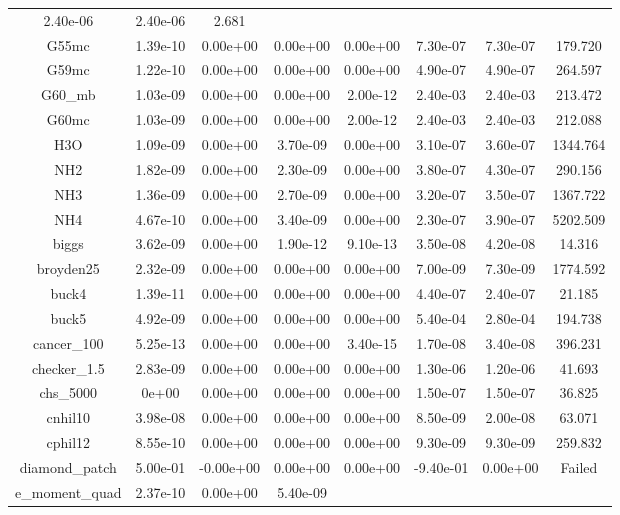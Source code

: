 {{\begin{table}[h]
\begin{center}
{\begin{tabular}{cccccccc}
      2.40e-06 & 2.40e-06 & 2.681\\
      G55mc & 1.39e-10 & 0.00e+00 & 0.00e+00 & 0.00e+00 &
      7.30e-07 & 7.30e-07 & 179.720\\
      G59mc & 1.22e-10 & 0.00e+00 & 0.00e+00 & 0.00e+00 &
      4.90e-07 & 4.90e-07 & 264.597\\
      G60\_mb & 1.03e-09 & 0.00e+00 & 0.00e+00 & 2.00e-12 &
      2.40e-03 & 2.40e-03 & 213.472\\
      G60mc & 1.03e-09 & 0.00e+00 & 0.00e+00 & 2.00e-12 &
      2.40e-03 & 2.40e-03 & 212.088\\
      H3O & 1.09e-09 & 0.00e+00 & 3.70e-09 & 0.00e+00 &
      3.10e-07 & 3.60e-07 & 1344.764\\
      NH2 & 1.82e-09 & 0.00e+00 & 2.30e-09 & 0.00e+00 &
      3.80e-07 & 4.30e-07 & 290.156\\
      NH3 & 1.36e-09 & 0.00e+00 & 2.70e-09 & 0.00e+00 &
      3.20e-07 & 3.50e-07 & 1367.722\\
      NH4 & 4.67e-10 & 0.00e+00 & 3.40e-09 & 0.00e+00 &
      2.30e-07 & 3.90e-07 & 5202.509\\
      biggs & 3.62e-09 & 0.00e+00 & 1.90e-12 & 9.10e-13 &
      3.50e-08 & 4.20e-08 & 14.316\\
      broyden25 & 2.32e-09 & 0.00e+00 & 0.00e+00 & 0.00e+00 &
      7.00e-09 & 7.30e-09 & 1774.592\\
      buck4 & 1.39e-11 & 0.00e+00 & 0.00e+00 & 0.00e+00 &
      4.40e-07 & 2.40e-07 & 21.185\\
      buck5 & 4.92e-09 & 0.00e+00 & 0.00e+00 & 0.00e+00 &
      5.40e-04 & 2.80e-04 & 194.738\\
      cancer\_100 & 5.25e-13 & 0.00e+00 & 0.00e+00 & 3.40e-15 &
      1.70e-08 & 3.40e-08 & 396.231\\
      checker\_1.5 & 2.83e-09 & 0.00e+00 & 0.00e+00 & 0.00e+00 &
      1.30e-06 & 1.20e-06 & 41.693\\
      chs\_5000 & 0e+00 & 0.00e+00 & 0.00e+00 & 0.00e+00 &
      1.50e-07 & 1.50e-07 & 36.825\\
      cnhil10 & 3.98e-08 & 0.00e+00 & 0.00e+00 & 0.00e+00 &
      8.50e-09 & 2.00e-08 & 63.071\\
      cphil12 & 8.55e-10 & 0.00e+00 & 0.00e+00 & 0.00e+00 &
      9.30e-09 & 9.30e-09 & 259.832\\
      diamond\_patch & 5.00e-01 & -0.00e+00 & 0.00e+00 & 0.00e+00
      & -9.40e-01 & 0.00e+00 & Failed\\
      e\_moment\_quad & 2.37e-10 & 0.00e+00 & 5.40e-09 &

\end{tabular}}
\end{center}
\end{table}}}
